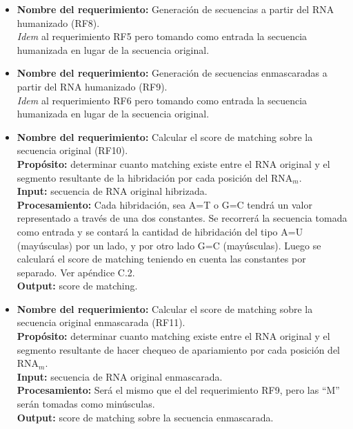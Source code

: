 \documentclass[12pt,a4paper,spanish]{article}
\begin{document}
\begin{itemize}
		\item \textbf{Nombre del requerimiento:} Generación de secuencias a partir del RNA humanizado (RF8).\\
		\textit{Idem} al requerimiento RF5 pero tomando como entrada la secuencia humanizada en lugar de la secuencia 						original. \\

		\item \textbf{Nombre del requerimiento:} Generación de secuencias enmascaradas a partir del RNA humanizado (RF9).\\
		\textit{Idem} al requerimiento RF6 pero tomando como entrada la secuencia humanizada en lugar de la secuencia 						original. \\
		
		\item \textbf{Nombre del requerimiento:} Calcular el score de matching sobre la secuencia original (RF10).\\
 	    \textbf{Propósito:} determinar cuanto matching existe entre el RNA original y el segmento resultante 
							de la hibridación por cada posición del RNA$_m$.\\
		\textbf{Input:} secuencia de RNA original hibrizada. \\
		\textbf{Procesamiento:} Cada hibridación, sea A=T o G=C tendrá un valor representado a través de una dos 									constantes. Se recorrerá la secuencia tomada como entrada y se contará la cantidad de 									hibridación del tipo A=U (mayúsculas) por un lado, y por otro lado G=C (mayúsculas). Luego 									se calculará el score de matching teniendo en cuenta las constantes por separado. Ver 									apéndice C.2. \\								
		\textbf{Output:} score de matching.\\

		\item \textbf{Nombre del requerimiento:} Calcular el score de matching sobre la secuencia original enmascarada 			(RF11).\\
 	    \textbf{Propósito:} determinar cuanto matching existe entre el RNA original y el segmento resultante de hacer 								chequeo de apariamiento por cada posición del RNA$_m$.\\
		\textbf{Input:} secuencia de RNA original enmascarada. \\
		\textbf{Procesamiento:} Será el mismo que el del requerimiento RF9, pero las ``M'' serán tomadas como 			 
        minúsculas.	\\
		\textbf{Output:} score de matching sobre la secuencia enmascarada.\\


\end{itemize}
\end{document}
